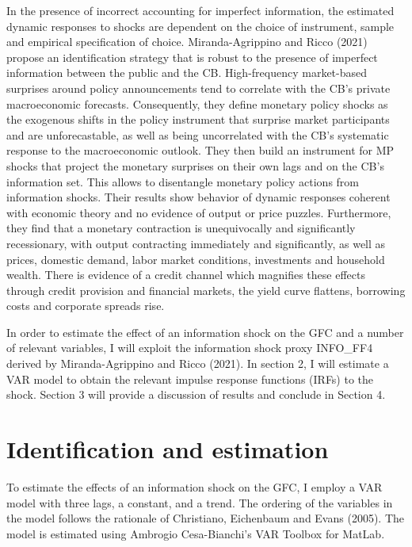 \documentclass[11pt,a4paper]{article}
\begin{document}
In the presence of incorrect accounting for imperfect information, the estimated dynamic responses to shocks are dependent on the choice of instrument, sample and empirical specification of choice. Miranda-Agrippino and Ricco (2021) propose an identification strategy that is robust to the presence of imperfect information between the public and the CB.
High-frequency market-based surprises around policy announcements tend to correlate with the CB's private macroeconomic forecasts. Consequently, they define  monetary policy shocks as the exogenous shifts in the policy instrument that surprise market participants and are unforecastable, as well as being uncorrelated with the CB's systematic response to the macroeconomic outlook. They then build an instrument for MP shocks that project the monetary surprises on their own lags and on the CB's information set. This allows to disentangle monetary policy actions from information shocks. 
Their results show behavior of dynamic responses coherent with economic theory and no evidence of output or price puzzles. Furthermore, they find that a monetary contraction is unequivocally and significantly recessionary, with output contracting immediately and significantly, as well as prices, domestic demand, labor market conditions, investments and household wealth. There is evidence of a credit channel which magnifies these effects through credit provision and financial markets, the yield curve flattens, borrowing costs and corporate spreads rise.


In order to estimate the effect of an information shock on the GFC and a number of relevant variables, I will exploit the information shock proxy INFO\_FF4 derived by Miranda-Agrippino and Ricco (2021).
In section 2, I will estimate a VAR model to obtain the relevant impulse response functions (IRFs) to the shock.
Section 3 will provide a discussion of results and conclude in Section 4.



\section{Identification and estimation}
To estimate the effects of an information shock on the GFC, I employ a VAR model with three lags, a constant, and a trend. The ordering of the variables in the model follows the rationale of Christiano, Eichenbaum and Evans (2005). The model is estimated using Ambrogio Cesa-Bianchi's VAR Toolbox for MatLab.
\end{document}
